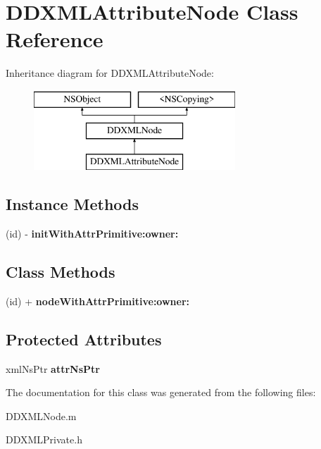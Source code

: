 \hypertarget{class_d_d_x_m_l_attribute_node}{}\section{D\+D\+X\+M\+L\+Attribute\+Node Class Reference}
\label{class_d_d_x_m_l_attribute_node}
Inheritance diagram for D\+D\+X\+M\+L\+Attribute\+Node\+:\begin{figure}[H]
\begin{center}
\leavevmode
\includegraphics[height=3.000000cm]{class_d_d_x_m_l_attribute_node}
\end{center}
\end{figure}
\subsection*{Instance Methods}
\begin{DoxyCompactItemize}
\item 
\hypertarget{class_d_d_x_m_l_attribute_node_a5b2ba19d4681de1d0b58a0484726fadb}{}(id) -\/ {\bfseries init\+With\+Attr\+Primitive\+:owner\+:}\label{class_d_d_x_m_l_attribute_node_a5b2ba19d4681de1d0b58a0484726fadb}

\end{DoxyCompactItemize}
\subsection*{Class Methods}
\begin{DoxyCompactItemize}
\item 
\hypertarget{class_d_d_x_m_l_attribute_node_a673a2ac4394b7c0bc63ac1a75c8794cb}{}(id) + {\bfseries node\+With\+Attr\+Primitive\+:owner\+:}\label{class_d_d_x_m_l_attribute_node_a673a2ac4394b7c0bc63ac1a75c8794cb}

\end{DoxyCompactItemize}
\subsection*{Protected Attributes}
\begin{DoxyCompactItemize}
\item 
\hypertarget{class_d_d_x_m_l_attribute_node_aec5818f7265c8df0abc080317a57e9b5}{}xml\+Ns\+Ptr {\bfseries attr\+Ns\+Ptr}\label{class_d_d_x_m_l_attribute_node_aec5818f7265c8df0abc080317a57e9b5}

\end{DoxyCompactItemize}


The documentation for this class was generated from the following files\+:\begin{DoxyCompactItemize}
\item 
D\+D\+X\+M\+L\+Node.\+m\item 
D\+D\+X\+M\+L\+Private.\+h\end{DoxyCompactItemize}
